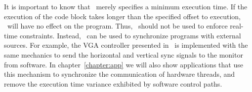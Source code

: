 It is important to know that \delayuntil\ merely specifies a minimum execution time.
If the execution of the code block takes longer than the specified offset to execution, \delayuntil\ will have no effect on the program.
Thus, \delayuntil\ should not be used to enforce real-time constraints.
Instead, \delayuntil\ can be used to synchronize programs with external sources. 
For example, the VGA controller presented in~\cite{ip2006processor} is implemented with the same mechanics to send the horizontal and vertical sync signals to the monitor from software.
In chapter~\ref{chapter:app} we will also show applications that use this mechanism to synchronize the communication of hardware threads, and remove the execution time variance exhibited by software control paths.  
    
% 

